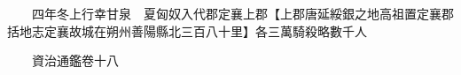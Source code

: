 　　四年冬上行幸甘泉　夏匈奴入代郡定襄上郡【上郡唐延綏銀之地高祖置定襄郡括地志定襄故城在朔州善陽縣北三百八十里】各三萬騎殺略數千人

　　資治通鑑卷十八


    


 


 



 

 
  







 


　　
　　
　
　
　


　　

　















	
	









































 
  



















 





 












  
  
  

 





